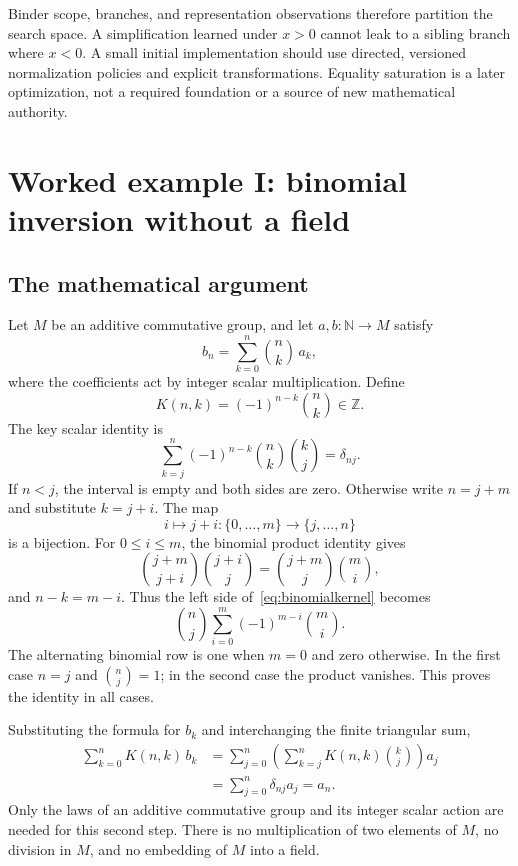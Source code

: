 \documentclass[11pt,a4paper]{article}
\newcommand{\N}{\mathbb{N}}
\newcommand{\Z}{\mathbb{Z}}
\theoremstyle{definition}
\begin{document}
Binder scope, branches, and representation observations therefore partition the
search space. A simplification learned under $x>0$ cannot leak to a sibling
branch where $x<0$. A small initial implementation should use directed,
versioned normalization policies and explicit transformations. Equality
saturation is a later optimization, not a required foundation or a source of
new mathematical authority.

\section{Worked example I: binomial inversion without a field}
\label{sec:binomial}
\subsection{The mathematical argument}
Let $M$ be an additive commutative group, and let $a,b:\N\to M$ satisfy
\[
 b_n=\sum_{k=0}^{n}\binom nk\,a_k,
\]
where the coefficients act by integer scalar multiplication. Define
\[
 K(n,k)=(-1)^{n-k}\binom nk\in\Z.
\]
The key scalar identity is
\begin{equation}
 \sum_{k=j}^{n}(-1)^{n-k}\binom nk\binom kj=\delta_{nj}.
 \label{eq:binomialkernel}
\end{equation}
If $n<j$, the interval is empty and both sides are zero. Otherwise write
$n=j+m$ and substitute $k=j+i$. The map
\[
 i\longmapsto j+i:\{0,\ldots,m\}\longrightarrow\{j,\ldots,n\}
\]
is a bijection. For $0\leq i\leq m$, the binomial product identity gives
\[
 \binom{j+m}{j+i}\binom{j+i}{j}
 =\binom{j+m}{j}\binom mi,
\]
and $n-k=m-i$. Thus the left side of~\eqref{eq:binomialkernel} becomes
\[
 \binom nj\sum_{i=0}^{m}(-1)^{m-i}\binom mi.
\]
The alternating binomial row is one when $m=0$ and zero otherwise. In the first
case $n=j$ and $\binom nj=1$; in the second case the product vanishes. This proves
the identity in all cases.

Substituting the formula for $b_k$ and interchanging the finite triangular sum,
\begin{align*}
 \sum_{k=0}^{n}K(n,k)\,b_k
 &=\sum_{j=0}^{n}
   \left(\sum_{k=j}^{n}K(n,k)\binom kj\right)a_j\\
 &=\sum_{j=0}^{n}\delta_{nj}a_j=a_n.
\end{align*}
Only the laws of an additive commutative group and its integer scalar action
are needed for this second step. There is no multiplication of two elements
of $M$, no division in $M$, and no embedding of $M$ into a field.
\end{document}
